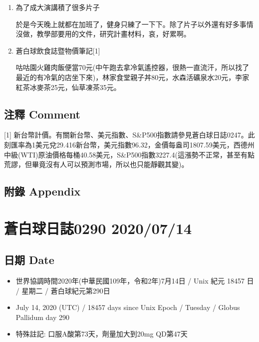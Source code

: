 \documentclass[
]{article}
\providecommand{\tightlist}{%
  \setlength{\itemsep}{0pt}\setlength{\parskip}{0pt}}
\begin{document}
\begin{enumerate}
\def\labelenumi{\arabic{enumi}.}
\item
  為了成大演講積了很多片子

  於是今天晚上就都在加班了，健身只練了一下下。除了片子以外還有好多事情沒做，教學部要用的文件，研究計畫材料，哀，好累啊。
\item
  蒼白球飲食誌暨物價筆記{[}1{]}

  咕咕園火雞肉飯便當70元(中午跑去拿冷氣遙控器，很熱一直流汗，所以找了最近的有冷氣的店坐下來)，林家食堂親子丼80元，水森活礦泉水20元，李家紅茶冰麥茶25元，仙草凍茶35元。
\end{enumerate}

\hypertarget{ux6ce8ux91cb-comment-12}{%
\subsection{注釋 Comment}\label{ux6ce8ux91cb-comment-12}}

{[}1{]}
新台幣計價。有關新台幣、美元指數、S\&P500指數請參見蒼白球日誌0247。此刻匯率為1美元兌29.416新台幣，美元指數96.32，金價每盎司1807.59美元，西德州中級(WTI)原油價格每桶40.58美元，S\&P500指數3227.4(這漲勢不正常，甚至有點荒謬，但畢竟沒有人可以預測市場，所以也只能靜觀其變)。

\hypertarget{ux9644ux9304-appendix-12}{%
\subsection{附錄 Appendix}\label{ux9644ux9304-appendix-12}}

\hypertarget{ux84bcux767dux7403ux65e5ux8a8c0290-20200714}{%
\section{蒼白球日誌0290
2020/07/14}\label{ux84bcux767dux7403ux65e5ux8a8c0290-20200714}}

\hypertarget{ux65e5ux671f-date-13}{%
\subsection{日期 Date}\label{ux65e5ux671f-date-13}}

\begin{itemize}
\tightlist
\item
  世界協調時間2020年(中華民國109年，令和2年)7月14日 / Unix 紀元 18457 日
  / 星期二 / 蒼白球紀元第290日
\item
  July 14, 2020 (UTC) / 18457 days since Unix Epoch / Tuesday / Globus
  Pallidum day 290
\item
  特殊註記: 口服A酸第73天，劑量加大到20mg QD第47天
\end{itemize}
\end{document}
